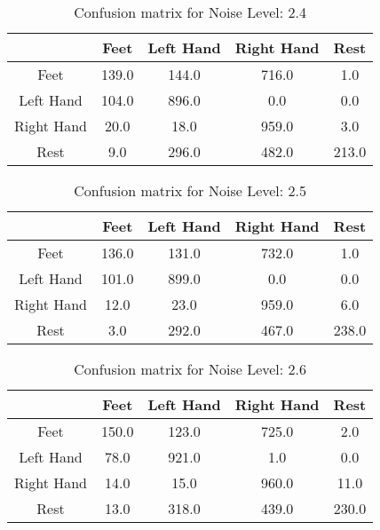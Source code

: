 \begin{table}[!htbp]
    \centering
    \begin{tabular}{|c||c|c|c|c|}
        \hline
		 & Feet & Left Hand & Right Hand & Rest \\
        \hline
        \hline
        Feet & 139.0 & 144.0 & 716.0 & 1.0 \\
        \hline
        Left Hand & 104.0 & 896.0 & 0.0 & 0.0 \\
        \hline
        Right Hand & 20.0 & 18.0 & 959.0 & 3.0 \\
        \hline
        Rest & 9.0 & 296.0 & 482.0 & 213.0 \\
        \hline
    \end{tabular}
    \caption{Confusion matrix for Noise Level: 2.4}
\end{table}

\begin{table}[!htbp]
    \centering
    \begin{tabular}{|c||c|c|c|c|}
        \hline
		 & Feet & Left Hand & Right Hand & Rest \\
        \hline
        \hline
        Feet & 136.0 & 131.0 & 732.0 & 1.0 \\
        \hline
        Left Hand & 101.0 & 899.0 & 0.0 & 0.0 \\
        \hline
        Right Hand & 12.0 & 23.0 & 959.0 & 6.0 \\
        \hline
        Rest & 3.0 & 292.0 & 467.0 & 238.0 \\
        \hline
    \end{tabular}
    \caption{Confusion matrix for Noise Level: 2.5}
\end{table}

\begin{table}[!htbp]
    \centering
    \begin{tabular}{|c||c|c|c|c|}
        \hline
		 & Feet & Left Hand & Right Hand & Rest \\
        \hline
        \hline
        Feet & 150.0 & 123.0 & 725.0 & 2.0 \\
        \hline
        Left Hand & 78.0 & 921.0 & 1.0 & 0.0 \\
        \hline
        Right Hand & 14.0 & 15.0 & 960.0 & 11.0 \\
        \hline
        Rest & 13.0 & 318.0 & 439.0 & 230.0 \\
        \hline
    \end{tabular}
    \caption{Confusion matrix for Noise Level: 2.6}
\end{table}

